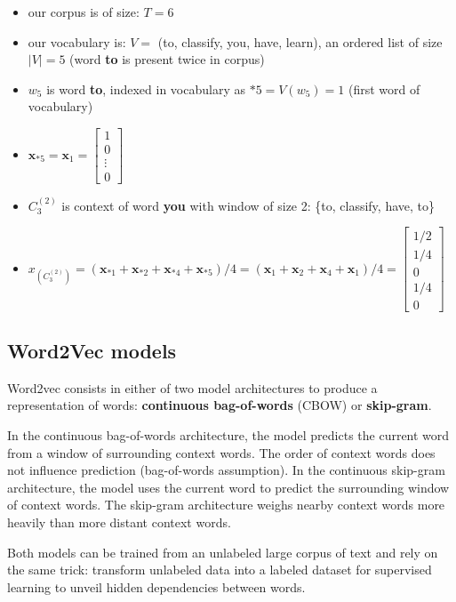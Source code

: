\begin{itemize}
	\item our corpus is of size: $T=6$
	\item our vocabulary is: $V =$ (to, classify, you, have, learn), an ordered list of size $|V| = 5$ (word \textbf{to} is present twice in corpus)
	\item $w_5$ is word \textbf{to}, indexed in vocabulary as $*5 = V(w_5) = 1$ (first word of vocabulary)
	\item $\mathbf{x}_{*5} = \mathbf{x}_{1} = \begin{bmatrix} 
		1 \\
		0 \\
		\vdots\\
		0
	\end{bmatrix}$
	\item $C_3^{(2)}$ is context of word \textbf{you} with window of size 2: \{to, classify, have, to\}
	\item $x_{(C_3^{(2)})} = 
	(\mathbf{x}_{*1} +\mathbf{x}_{*2} + \mathbf{x}_{*4} + \mathbf{x}_{*5}) / 4 = (\mathbf{x}_{1} +\mathbf{x}_{2} + \mathbf{x}_{4} + \mathbf{x}_{1}) / 4
	=\begin{bmatrix} 
		1/2 \\
		1/4 \\
		0\\
		1/4\\
		0
	\end{bmatrix}$
\end{itemize}


\subsection{Word2Vec models}

Word2vec consists in either of two model architectures to produce a representation of words: \textbf{continuous bag-of-words} (CBOW) or \textbf{skip-gram}. 

In the continuous bag-of-words architecture, the model predicts the current word from a window of surrounding context words. The order of context words does not influence prediction (bag-of-words assumption). In the continuous skip-gram architecture, the model uses the current word to predict the surrounding window of context words. 
The skip-gram architecture weighs nearby context words more heavily than more distant context words.

Both models can be trained from an unlabeled large corpus of text and rely on the same trick: transform unlabeled data into a labeled dataset for supervised learning to unveil hidden dependencies between words.

